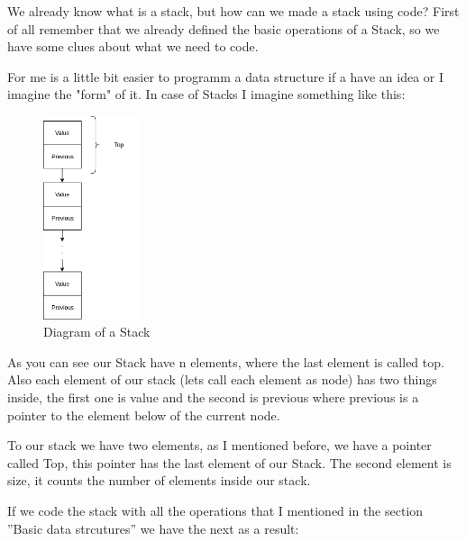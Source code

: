 We already know what is a stack, but how can we made a stack using code? First of all remember that we already defined the basic operations of a Stack, so we have some clues about what we need to code.

For me is a little bit easier to programm a data structure if a have an idea or I imagine the "form" of it. 
In case of Stacks I imagine something like this:

\begin{figure}[H]
    \centering
    \includegraphics[width=0.25\textwidth]{Images/DataStructures/Stack/Stack.png}
    \caption{Diagram of a Stack}
    \label{fig:stack_diagram-01}
\end{figure}

As you can see our Stack have n elements, where the last element is called top. Also each element of our stack (lets call each element as node) has two things inside, the first one is value and the second is previous where previous is a pointer to the element below of the current node.

To our stack we have two elements, as I mentioned before, we have a pointer called Top, this pointer has the last element of our Stack. The second element is size, it counts the number of elements inside our stack.

If we code the stack with all the operations that I mentioned in the section ''Basic data strcutures'' we have the next as a result:

